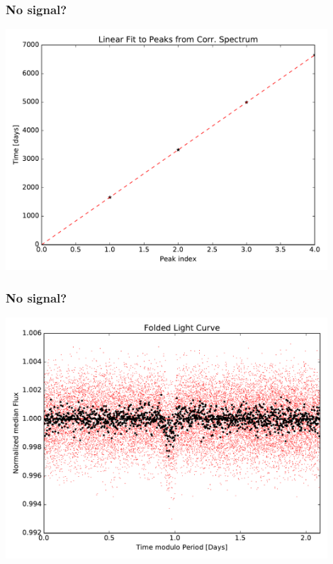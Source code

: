 \documentclass[notes]{beamer}
\begin{document}
\begin{frame}
\frametitle{No signal?}
\centering
\includegraphics[width=0.9\textwidth]{../figures/2019-1-15_16:2:14_linear_fit_TIC89020549.pdf}
\end{frame}

\begin{frame}
\frametitle{No signal?}
\centering
\includegraphics[width=0.9\textwidth]{../figures/2019-1-15_16:2:14_Folded_TIC89020549.pdf}
\end{frame}
\end{document}
